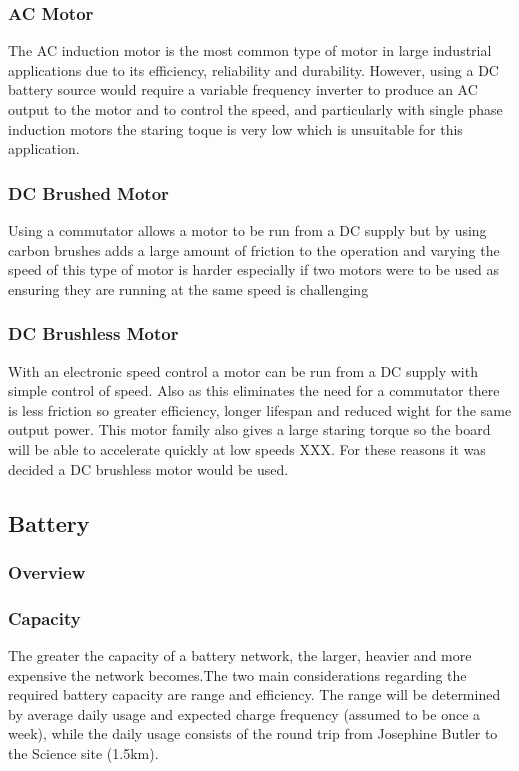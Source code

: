 \documentclass[journal,10pt]{IEEEtran}
\begin{document}
        \subsubsection{AC Motor}
        The AC induction motor is the most common type of motor in large industrial applications due to its efficiency, reliability and durability. However, using a DC battery source would require a variable frequency inverter to produce an AC output to the motor and to control the speed, and particularly with single phase induction motors the staring toque is very low which is unsuitable for this application. 
        \subsubsection{DC Brushed Motor}
        Using a commutator allows a motor to be run from a DC supply but by using carbon brushes adds a large amount of friction to the operation and varying the speed of this type of motor is harder especially if two motors were to be used as ensuring they are running at the same speed is challenging
        \subsubsection{DC Brushless Motor}
        With an electronic speed control a motor can be run from a DC supply with simple control of speed. Also as this eliminates the need for a commutator there is less friction so greater efficiency, longer lifespan and reduced wight for the same output power. This motor family also gives a large staring torque so the board will be able to accelerate quickly at low speeds XXX. For these reasons it was decided a DC brushless motor would be used.
    \subsection{Battery}
        \subsubsection{Overview}
        \subsubsection{Capacity}
        The greater the capacity of a battery network, the larger, heavier and more expensive the network becomes.The two main considerations regarding the required battery capacity are range and efficiency. The range will be determined by average daily usage and expected charge frequency (assumed to be once a week), while the daily usage consists of the round trip from Josephine Butler to the Science site (1.5km).
        
\end{document}
